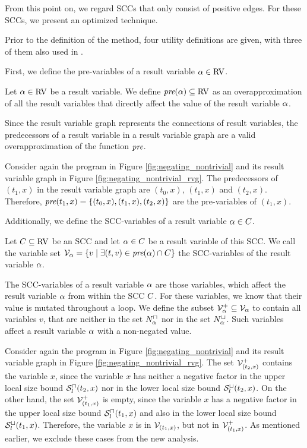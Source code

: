 From this point on, we regard SCCs that only consist of positive edges.
For these SCCs, we present an optimized technique.

Prior to the definition of the method, four utility definitions are given, with three of them also used in \cite{koat}.

First, we define the pre-variables of a result variable $\alpha \in \text{RV}$.
\begin{definition}
  Let $\alpha \in \text{RV}$ be a result variable.
  We define $\emph{pre}(\alpha) \subseteq \text{RV}$ as an overapproximation of all the result variables that directly affect the value of the result variable $\alpha$.
\end{definition}
Since the result variable graph represents the connections of result variables, the predecessors of a result variable in a result variable graph are a valid overapproximation of the function $\emph{pre}$.
\begin{example}
  Consider again the program in Figure \ref{fig:negating_nontrivial} and its result variable graph in Figure \ref{fig:negating_nontrivial_rvg}.
  The predecessors of $(t_1,x)$ in the result variable graph are $(t_0,x)$, $(t_1,x)$ and $(t_2,x)$.
  Therefore, $\emph{pre}(t_1,x) = \lbrace (t_0,x), (t_1,x), (t_2,x) \rbrace$ are the pre-variables of $(t_1,x)$.
\end{example}

Additionally, we define the SCC-variables of a result variable $\alpha \in C$.
\begin{definition}
  Let $C \subseteq \text{RV}$ be an SCC and let $\alpha \in C$ be a result variable of this SCC.
  We call the variable set $\mathcal{V}_\alpha = \lbrace  v \mid \exists (t, v) \in \emph{pre}(\alpha) \cap C  \rbrace$ the SCC-variables of the result variable $\alpha$.
\end{definition}
The SCC-variables of a result variable $\alpha$ are those variables, which affect the result variable $\alpha$ from within the SCC $C$.
For these variables, we know that their value is mutated throughout a loop.
We define the subset $\mathcal{V}^+_\alpha \subseteq \mathcal{V}_\alpha$ to contain all variables $v$, that are neither in the set $N^\sqcap_\alpha$ nor in the set $N^\sqcup_\alpha$.
Such variables affect a result variable $\alpha$ with a non-negated value.
\begin{example}
  Consider again the program in Figure \ref{fig:negating_nontrivial} and its result variable graph in Figure \ref{fig:negating_nontrivial_rvg}.
  The set $\mathcal{V}^+_{(t_2,x)}$ contains the variable $x$, since the variable $x$ has neither a negative factor in the upper local size bound ${\mathcal{S}^\sqcap_l}(t_2,x)$ nor in the lower local size bound ${\mathcal{S}^\sqcup_l}(t_2,x)$.
  On the other hand, the set $\mathcal{V}^+_{(t_1,x)}$ is empty, since the variable $x$ has a negative factor in the upper local size bound ${\mathcal{S}^\sqcap_l}(t_1,x)$ and also in the lower local size bound ${\mathcal{S}^\sqcup_l}(t_1,x)$.
  Therefore, the variable $x$ is in $\mathcal{V}_{(t_1,x)}$, but not in $\mathcal{V}^+_{(t_1,x)}$.
  As mentioned earlier, we exclude these cases from the new analysis.
\end{example}

